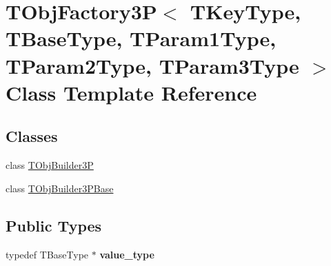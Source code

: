 \hypertarget{class_t_obj_factory3_p}{\section{T\+Obj\+Factory3\+P$<$ T\+Key\+Type, T\+Base\+Type, T\+Param1\+Type, T\+Param2\+Type, T\+Param3\+Type $>$ Class Template Reference}
\label{class_t_obj_factory3_p}
}
\subsection*{Classes}
\begin{DoxyCompactItemize}
\item 
class \hyperlink{class_t_obj_factory3_p_1_1_t_obj_builder3_p}{T\+Obj\+Builder3\+P}
\item 
class \hyperlink{class_t_obj_factory3_p_1_1_t_obj_builder3_p_base}{T\+Obj\+Builder3\+P\+Base}
\end{DoxyCompactItemize}
\subsection*{Public Types}
\begin{DoxyCompactItemize}
\item 
\hypertarget{class_t_obj_factory3_p_a5a559ef874489d1517d4c351d54d5f98}{typedef T\+Base\+Type $\ast$ {\bfseries value\+\_\+type}}\label{class_t_obj_factory3_p_a5a559ef874489d1517d4c351d54d5f98}

\end{DoxyCompactItemize}
